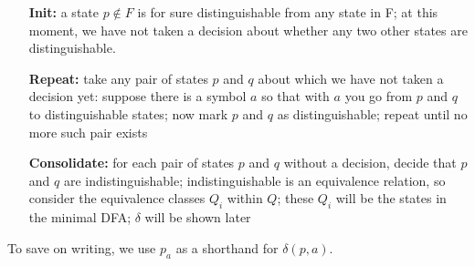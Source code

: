 \begin{itemize}
\item[{\bf Init:}]
a state $p \notin F$ is for sure distinguishable from any state in
F; at this moment, we have not taken a decision about whether any two other states are distinguishable.

\item[{\bf Repeat:}]
take any pair of states $p$ and $q$ about which we have not taken a
decision yet: suppose there is a symbol $a$ so that with $a$ you go
from $p$ and $q$ to distinguishable states; now mark $p$ and $q$ as
distinguishable; repeat until no more such pair exists

\item[{\bf Consolidate:}]
for each pair of states $p$ and $q$ without a decision, decide that
$p$ and $q$ are indistinguishable; indistinguishable is an equivalence
relation, so consider the equivalence classes $Q_i$ within $Q$; these
$Q_i$ will be the states in the minimal DFA; $\delta$ will be shown
later
\end{itemize}

To save on writing, we use $p_a$ as a shorthand for $\delta(p,a)$.


